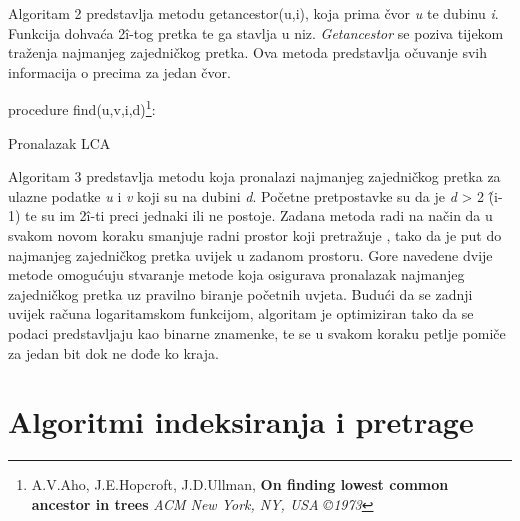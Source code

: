 \documentclass[times, utf8, zavrsni]{fer}
\begin{document}
{Algoritam 2 predstavlja metodu getancestor(u,i), koja prima čvor \textit{u} te dubinu \textit{i}. Funkcija dohvaća 2\^ i-tog pretka te ga stavlja u niz. \textit{Getancestor} se poziva tijekom traženja najmanjeg zajedničkog pretka. Ova metoda predstavlja očuvanje svih informacija o precima za jedan čvor. 
\newline
\begin{algorithm}[H]

		procedure find(u,v,i,d)\footnote[2]{A.V.Aho, J.E.Hopcroft, J.D.Ullman, \textbf{On finding lowest common ancestor in trees} \textit{ACM New York, NY, USA ©1973}}:\\
	\caption{Pronalazak LCA}
	\label{LCA algorithm 2}
	
\end{algorithm}

Algoritam 3 predstavlja metodu koja pronalazi najmanjeg zajedničkog pretka za ulazne podatke \textit{u} i \textit{v} koji su na dubini \textit{d}. Početne pretpostavke su da je \textit{d} > 2 \^(i-1) te su im 2\^i-ti preci jednaki ili ne postoje. Zadana metoda radi na način da u svakom novom koraku smanjuje radni prostor koji pretražuje , tako da je put do najmanjeg zajedničkog pretka uvijek u zadanom prostoru. Gore navedene dvije metode omogućuju stvaranje metode koja osigurava pronalazak najmanjeg zajedničkog pretka uz pravilno biranje početnih uvjeta. Budući da se zadnji uvijek računa logaritamskom funkcijom, algoritam je optimiziran tako da se podaci predstavljaju kao binarne znamenke, te se u svakom koraku petlje pomiče za jedan bit dok ne dođe ko kraja.
\chapter{Algoritmi indeksiranja i pretrage}
}
\end{document}
